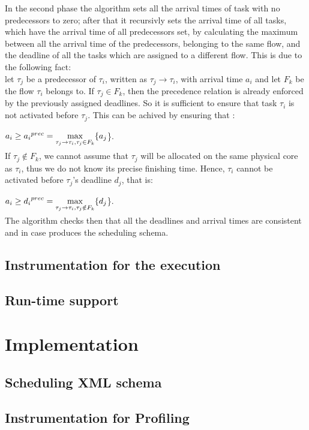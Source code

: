 \documentclass[a4paper,11pt,oneside]{book}
\begin{document}
In the second phase the algorithm sets all the arrival times of task with no predecessors to zero; after that it recursivly sets the arrival time of all tasks, which have the arrival time of all predecessors set, by calculating the maximum between all the arrival time of the predecessors, belonging to the same flow, and the deadline of all the tasks which are assigned to a different flow. This is due to the following fact: \\
let $\tau_j$ be a predecessor of $\tau_i$, written as $\tau_j \rightarrow \tau_i$, with arrival time $a_i$ and let $F_k$ be the flow $\tau_i$ belongs to. If $\tau_j \in F_k$, then the precedence relation is already enforced by the previously assigned deadlines. So it is sufficient to ensure that task $\tau_i$ is not activated before $\tau_j$. This can be achived by ensuring that :
\begin{center}$ a_i \ge  {a_i}^{prec} = \smash{\displaystyle\max_{\tau_j \rightarrow \tau_i,\tau_j \in F_k} }\{a_j$\}.\end{center}
If $\tau_j \notin F_k$, we cannot assume that $\tau_j$ will be allocated on the same physical core as $\tau_i$, thus we do not know its precise finishing time. Hence, $\tau_i$ cannot be activated before $\tau_j$'s deadline $d_j$, that is:
\begin{center}$ a_i \ge  {d_i}^{prec} = \smash{\displaystyle\max_{\tau_j \rightarrow \tau_i,\tau_j \notin F_k} }\{d_j$\}.\end{center}
The algorithm checks then that all the deadlines and arrival times are consistent and in case produces the scheduling schema.

\section{Instrumentation for the execution}
\section{Run-time support}

\chapter{Implementation}
\section{Scheduling XML schema}
\section{Instrumentation for Profiling}
\end{document}
